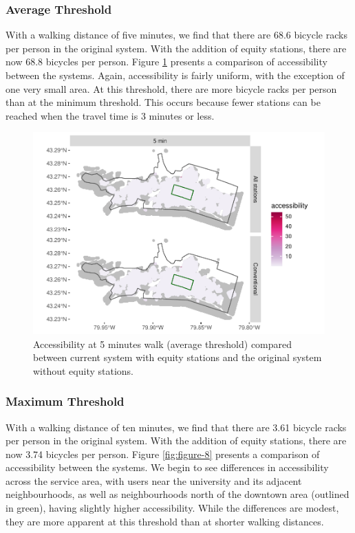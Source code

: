 \documentclass[]{elsarticle} %
\begin{document}
\hypertarget{average-threshold}{%
\subsubsection{Average Threshold}\label{average-threshold}}

With a walking distance of five minutes, we find that there are 68.6
bicycle racks per person in the original system. With the addition of
equity stations, there are now 68.8 bicycles per person. Figure
\ref{fig:figure-7} presents a comparison of accessibility between the
systems. Again, accessibility is fairly uniform, with the exception of
one very small area. At this threshold, there are more bicycle racks per
person than at the minimum threshold. This occurs because fewer stations
can be reached when the travel time is 3 minutes or less.

\begin{figure}

{\centering \includegraphics[width=0.9\linewidth]{Bike-share-spatial-equity_files/figure-latex/figure-7-1} 

}

\caption{Accessibility at 5 minutes walk (average threshold) compared between current system with equity stations and the original system without equity stations.}\label{fig:figure-7}
\end{figure}

\hypertarget{maximum-threshold}{%
\subsubsection{Maximum Threshold}\label{maximum-threshold}}

With a walking distance of ten minutes, we find that there are 3.61
bicycle racks per person in the original system. With the addition of
equity stations, there are now 3.74 bicycles per person. Figure
\ref{fig:figure-8} presents a comparison of accessibility between the
systems. We begin to see differences in accessibility across the service
area, with users near the university and its adjacent neighbourhoods, as
well as neighbourhoods north of the downtown area (outlined in green),
having slightly higher accessibility. While the differences are modest,
they are more apparent at this threshold than at shorter walking
distances.
\end{document}
